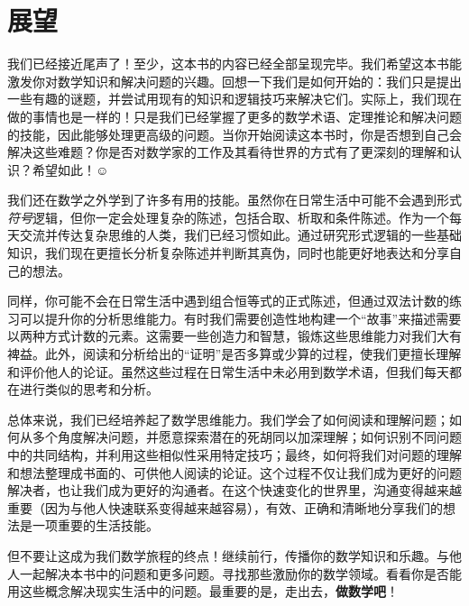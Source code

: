 \section{展望}

我们已经接近尾声了！至少，这本书的内容已经全部呈现完毕。我们希望这本书能激发你对数学知识和解决问题的兴趣。回想一下我们是如何开始的：我们只是提出一些有趣的谜题，并尝试用现有的知识和逻辑技巧来解决它们。实际上，我们现在做的事情也是一样的！只是我们已经掌握了更多的数学术语、定理推论和解决问题的技能，因此能够处理更高级的问题。当你开始阅读这本书时，你是否想到自己会解决这些难题？你是否对数学家的工作及其看待世界的方式有了更深刻的理解和认识？希望如此！$\smiley{}$

我们还在数学之外学到了许多有用的技能。虽然你在日常生活中可能不会遇到形式\emph{符号}逻辑，但你一定会处理复杂的陈述，包括合取、析取和条件陈述。作为一个每天交流并传达复杂思维的人类，我们已经习惯如此。通过研究形式逻辑的一些基础知识，我们现在更擅长分析复杂陈述并判断其真伪，同时也能更好地表达和分享自己的想法。

同样，你可能不会在日常生活中遇到组合恒等式的正式陈述，但通过双法计数的练习可以提升你的分析思维能力。有时我们需要创造性地构建一个``故事''来描述需要以两种方式计数的元素。这需要一些创造力和智慧，锻炼这些思维能力对我们大有裨益。此外，阅读和分析给出的``证明''是否多算或少算的过程，使我们更擅长理解和评价他人的论证。虽然这些过程在日常生活中未必用到数学术语，但我们每天都在进行类似的思考和分析。

总体来说，我们已经培养起了数学思维能力。我们学会了如何阅读和理解问题；如何从多个角度解决问题，并愿意探索潜在的死胡同以加深理解；如何识别不同问题中的共同结构，并利用这些相似性采用特定技巧；最终，如何将我们对问题的理解和想法整理成书面的、可供他人阅读的论证。这个过程不仅让我们成为更好的问题解决者，也让我们成为更好的沟通者。在这个快速变化的世界里，沟通变得越来越重要（因为与他人快速联系变得越来越容易），有效、正确和清晰地分享我们的想法是一项重要的生活技能。

但不要让这成为我们数学旅程的终点！继续前行，传播你的数学知识和乐趣。与他人一起解决本书中的问题和更多问题。寻找那些激励你的数学领域。看看你是否能用这些概念解决现实生活中的问题。最重要的是，走出去，\textbf{做数学吧}！

